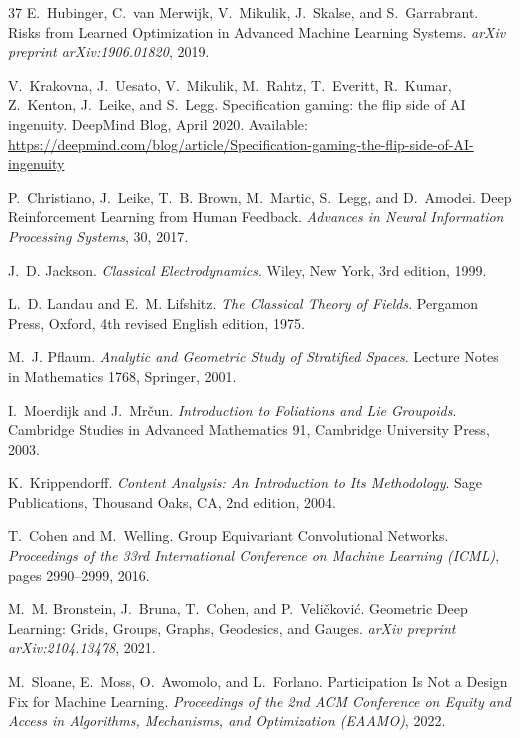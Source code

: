 \documentclass[12pt]{article}
\begin{document}
\begin{thebibliography}{37}
E.~Hubinger, C.~van Merwijk, V.~Mikulik, J.~Skalse, and S.~Garrabrant.
\newblock Risks from Learned Optimization in Advanced Machine Learning Systems.
\newblock \emph{arXiv preprint arXiv:1906.01820}, 2019.

V.~Krakovna, J.~Uesato, V.~Mikulik, M.~Rahtz, T.~Everitt, R.~Kumar, Z.~Kenton, J.~Leike, and S.~Legg.
\newblock Specification gaming: the flip side of AI ingenuity.
\newblock DeepMind Blog, April 2020.
\newblock Available: \url{https://deepmind.com/blog/article/Specification-gaming-the-flip-side-of-AI-ingenuity}

P.~Christiano, J.~Leike, T.~B. Brown, M.~Martic, S.~Legg, and D.~Amodei.
\newblock Deep Reinforcement Learning from Human Feedback.
\newblock \emph{Advances in Neural Information Processing Systems}, 30, 2017.

J.~D. Jackson.
\newblock \emph{Classical Electrodynamics}.
\newblock Wiley, New York, 3rd edition, 1999.

L.~D. Landau and E.~M. Lifshitz.
\newblock \emph{The Classical Theory of Fields}.
\newblock Pergamon Press, Oxford, 4th revised English edition, 1975.

M.~J. Pflaum.
\newblock \emph{Analytic and Geometric Study of Stratified Spaces}.
\newblock Lecture Notes in Mathematics 1768, Springer, 2001.

I.~Moerdijk and J.~Mr\v{c}un.
\newblock \emph{Introduction to Foliations and Lie Groupoids}.
\newblock Cambridge Studies in Advanced Mathematics 91, Cambridge University Press, 2003.

K.~Krippendorff.
\newblock \emph{Content Analysis: An Introduction to Its Methodology}.
\newblock Sage Publications, Thousand Oaks, CA, 2nd edition, 2004.

T.~Cohen and M.~Welling.
\newblock Group Equivariant Convolutional Networks.
\newblock \emph{Proceedings of the 33rd International Conference on Machine Learning (ICML)}, pages 2990--2999, 2016.

M.~M. Bronstein, J.~Bruna, T.~Cohen, and P.~Veli\v{c}kovi\'{c}.
\newblock Geometric Deep Learning: Grids, Groups, Graphs, Geodesics, and Gauges.
\newblock \emph{arXiv preprint arXiv:2104.13478}, 2021.

M.~Sloane, E.~Moss, O.~Awomolo, and L.~Forlano.
\newblock Participation Is Not a Design Fix for Machine Learning.
\newblock \emph{Proceedings of the 2nd ACM Conference on Equity and Access in Algorithms, Mechanisms, and Optimization (EAAMO)}, 2022.


\end{thebibliography}
\end{document}

